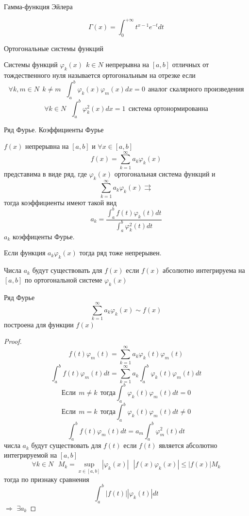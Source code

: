 \begin{title}[\Large]
  Гамма-функция Эйлера
\end{title}

$$
\Gamma(x) = \int_0^{+\infty} t^{x-1} e^{-t} dt
$$

\begin{title}[\Large]
  Ортогональные системы функций
\end{title}

\begin{define}
  Системы функций $\varphi_k(x) ~~ k \in N$ непрерывна на $[a,b]$
  отличных от тождественного нуля называется ортогональным на отрезке
  если
  $$
  \forall k,m \in N ~~ k \not= m
  ~~~
  \int_a^b \varphi_k(x)\varphi_m(x) dx = 0
  ~~
  \text{аналог скалярного произведения}
  $$
  $$
  \forall k \in N
  ~~~
  \int_a^b \varphi_k^2(x) dx = 1
  ~~
  \text{система ортонормированна}
  $$
\end{define}

\begin{title}[\Large]
  Ряд Фурье. Коэффициенты Фурье
\end{title}

\begin{theorem}
  $f(x)$ непрерывна на $[a,b]$ и $\forall x \in [a,b]$
  $$
  f(x) = \sum_{k=1}^{\infty} a_k \varphi_k(x)
  $$
  представима в виде ряд, где $\varphi_k(x)$ ортогональная система функций и
  $$
  \sum_{k=1}^{\infty} a_k \varphi_k(x) \rightrightarrows
  $$
  тогда коэффициенты имеют такой вид
  $$
  a_k = \frac{
    \int_a^b f(t) \varphi_k(t) dt
  }{
    \int_a^b \varphi_k^2(t) dt
  }
  $$
  $a_k$ коэффиценты Фурье.

  Если функция $a_k \varphi_k(x)$ тогда ряд тоже непрерывен.

  Числа $a_k$ будут существовать для $f(x)$ если
  $f(x)$ абсолютно интегрируема на $[a,b]$ по ортогональной системе
  $\varphi_k(x)$

  Ряд Фурье
  $$
  \sum_{k=1}^{\infty} a_k \varphi_k(x) \sim f(x)
  $$
  построена для функции $f(x)$
\end{theorem}

\begin{proof}
  $$
  f(t) \varphi_m(t) = \sum_{k=1}^{\infty} a_k \varphi_k(t) \varphi_m(t)
  $$
  $$
  \int_a^b f(t) \varphi_m(t) dt = \sum_{k=1}^{\infty} a_k \int_a^b
  \varphi_k(t) \varphi_m(t) dt
  $$
  $$
  \text{Если} ~~ m \not= k ~~ \text{тогда}
  \int_a^b \varphi_k(t) \varphi_m(t) dt = 0
  $$
  $$
  \text{Если} ~~ m = k ~~ \text{тогда}
  \int_a^b \varphi_k(t) \varphi_m(t) dt \not= 0
  $$
  $$
  \int_a^b f(t) \varphi_m(t) dt
  =
  a_m \int_a^b \varphi_m^2(t) dt
  $$
  числа $a_k$ будут существовать для $f(t)$ если $f(t)$ является абсолютно
  интегрируемой на $[a,b]$
  $$
  \forall k \in N
  ~~~
  M_k = \sup_{x \in [a,b]} |\varphi_k(x)|
  ~~~
  |f(x) \varphi_k(x)| \le |f(x)| M_k
  $$
  тогда по признаку сравнения
  $$
  \int_a^b |f(t)| |\varphi_k(t)| dt
  $$
  $\Rightarrow$ $\exists a_k$
\end{proof}

